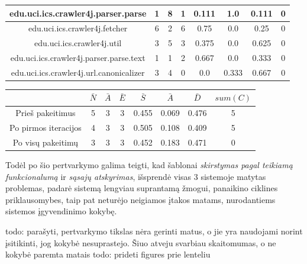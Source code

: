 \begin{center}
\begin{tabular}{|c|c|c|c|c|c|c|c|}
        \hline
        edu.uci.ics.crawler4j.parser.parse & 1 & 8 & 1 & 0.111 & 1.0 & 0.111 & 0 \\
        \hline
        edu.uci.ics.crawler4j.fetcher & 6 & 2 & 6 & 0.75 & 0.0 & 0.25 & 0 \\
        \hline
        edu.uci.ics.crawler4j.util & 3 & 5 & 3 & 0.375 & 0.0 & 0.625 & 0 \\
        \hline
        edu.uci.ics.crawler4j.parser.parse.text & 1 & 1 & 2 & 0.667 & 0.0 & 0.333 & 0 \\
        \hline
        edu.uci.ics.crawler4j.url.canonicalizer & 3 & 4 & 0 & 0.0 & 0.333 & 0.667 & 0 \\
        \hline
    \end{tabular}
    \begin{tabular}{|c|c|c|c|c|c|c|c|}
        \hline
        & $\bar{N}$ & $\bar{A}$ & $\bar{E}$ & $\bar{S}$ & $\bar{A}$ & $\bar{D}$ & $sum(C)$\\ [0.5ex]
        \hline\hline
        Prieš pakeitimus & 5 & 3 & 3 & 0.455 & 0.069 & 0.476 & 5\\
        \hline
        Po pirmos iteracijos & 4 & 3 & 3 & 0.505 & 0.108 & 0.409 & 5 \\
        \hline
        Po visų pakeitimų & 3 & 3 & 3 & 0.452 & 0.183 & 0.471 & 0 \\
        \hline
    \end{tabular}
\end{center}
Todėl po šio pertvarkymo galima teigti, kad šablonai \textit{skirstymas pagal teikiamą funkcionalumą} ir \textit{sąsajų atskyrimas}, išsprendė visas 3 sistemoje matytas problemas,
padarė sistemą lengviau suprantamą žmogui, panaikino ciklines priklausomybes, taip pat neturėjo neigiamos įtakos matams, nurodantiems
sistemos įgyvendinimo kokybę.

todo: parašyti, pertvarkymo tikslas nėra gerinti matus, o jie yra naudojami norint įsitikinti, jog kokybė nesuprastejo. Šiuo atveju svarbiau skaitomumas, o ne kokybė paremta matais
todo: prideti figures prie lenteliu